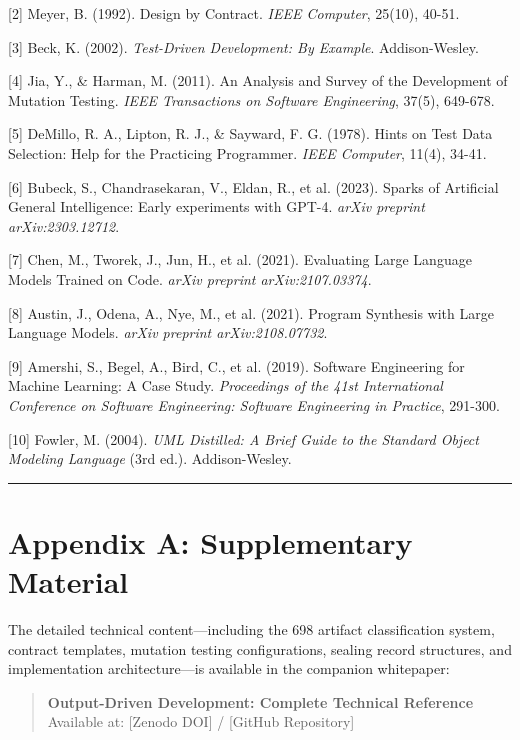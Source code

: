 \documentclass[
]{article}
\begin{document}
{[}2{]} Meyer, B. (1992). Design by Contract. \emph{IEEE Computer},
25(10), 40-51.

{[}3{]} Beck, K. (2002). \emph{Test-Driven Development: By Example}.
Addison-Wesley.

{[}4{]} Jia, Y., \& Harman, M. (2011). An Analysis and Survey of the
Development of Mutation Testing. \emph{IEEE Transactions on Software
Engineering}, 37(5), 649-678.

{[}5{]} DeMillo, R. A., Lipton, R. J., \& Sayward, F. G. (1978). Hints
on Test Data Selection: Help for the Practicing Programmer. \emph{IEEE
Computer}, 11(4), 34-41.

{[}6{]} Bubeck, S., Chandrasekaran, V., Eldan, R., et al. (2023). Sparks
of Artificial General Intelligence: Early experiments with GPT-4.
\emph{arXiv preprint arXiv:2303.12712}.

{[}7{]} Chen, M., Tworek, J., Jun, H., et al. (2021). Evaluating Large
Language Models Trained on Code. \emph{arXiv preprint arXiv:2107.03374}.

{[}8{]} Austin, J., Odena, A., Nye, M., et al. (2021). Program Synthesis
with Large Language Models. \emph{arXiv preprint arXiv:2108.07732}.

{[}9{]} Amershi, S., Begel, A., Bird, C., et al. (2019). Software
Engineering for Machine Learning: A Case Study. \emph{Proceedings of the
41st International Conference on Software Engineering: Software
Engineering in Practice}, 291-300.

{[}10{]} Fowler, M. (2004). \emph{UML Distilled: A Brief Guide to the
Standard Object Modeling Language} (3rd ed.). Addison-Wesley.

\begin{center}\rule{0.5\linewidth}{0.5pt}\end{center}

\hypertarget{appendix-a-supplementary-material}{%
\section{Appendix A: Supplementary
Material}\label{appendix-a-supplementary-material}}

The detailed technical content---including the 698 artifact
classification system, contract templates, mutation testing
configurations, sealing record structures, and implementation
architecture---is available in the companion whitepaper:

\begin{quote}
\textbf{Output-Driven Development: Complete Technical Reference}\\
Available at: {[}Zenodo DOI{]} / {[}GitHub Repository{]}
\end{quote}
\end{document}
